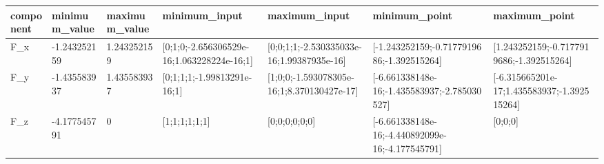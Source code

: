 \begin{tabular}{@{}lllllll@{}}
\toprule
component & minimum\_value & maximum\_value & minimum\_input & maximum\_input & minimum\_point & maximum\_point \\
\midrule
F\_x & -1.243252159 & 1.243252159 & [0;1;0;-2.656306529e-16;1.063228224e-16;1] & [0;0;1;1;-2.530335033e-16;1.99387935e-16] & [-1.243252159;-0.7177919686;-1.392515264] & [1.243252159;-0.7177919686;-1.392515264] \\
F\_y & -1.435583937 & 1.435583937 & [0;1;1;1;-1.99813291e-16;1] & [1;0;0;-1.593078305e-16;1;8.370130427e-17] & [-6.661338148e-16;-1.435583937;-2.785030527] & [-6.315665201e-17;1.435583937;-1.392515264] \\
F\_z & -4.177545791 & 0 & [1;1;1;1;1;1] & [0;0;0;0;0;0] & [-6.661338148e-16;-4.440892099e-16;-4.177545791] & [0;0;0] \\
\bottomrule
\end{tabular}

